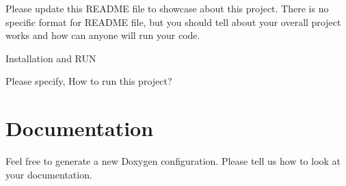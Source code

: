 Please update this R\-E\-A\-D\-M\-E file to showcase about this project. There is no specific format for R\-E\-A\-D\-M\-E file, but you should tell about your overall project works and how can anyone will run your code.

Installation and R\-U\-N

Please specify, How to run this project?

\section*{Documentation }

Feel free to generate a new Doxygen configuration. Please tell us how to look at your documentation. 